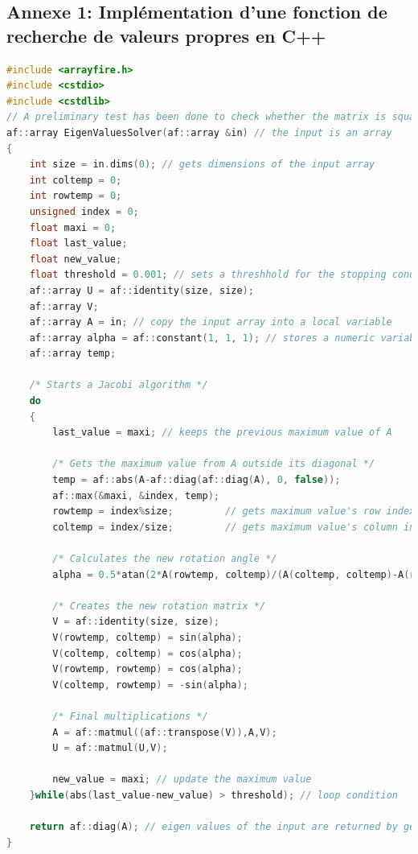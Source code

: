 \documentclass[10pt]{report}
\begin{document}
\begin{appendix}
	\chapter*{Annexe 1: Implémentation d'une fonction de recherche de valeurs propres en C++}
\vspace{-1cm}
\begin{lstlisting}[language=C++]
#include <arrayfire.h>
#include <cstdio>
#include <cstdlib>
// A preliminary test has been done to check whether the matrix is square and symmteric or not
af::array EigenValuesSolver(af::array &in) // the input is an array
{
	int size = in.dims(0); // gets dimensions of the input array
	int coltemp = 0;
	int rowtemp = 0;
	unsigned index = 0;
	float maxi = 0;
	float last_value;
	float new_value;
	float threshold = 0.001; // sets a threshhold for the stopping condition of the algorithm
	af::array U = af::identity(size, size);
	af::array V;
	af::array A = in; // copy the input array into a local variable
	af::array alpha = af::constant(1, 1, 1); // stores a numeric variable in an array
	af::array temp;
	
	/* Starts a Jacobi algorithm */
	do
	{
		last_value = maxi; // keeps the previous maximum value of A 
		
		/* Gets the maximum value from A outside its diagonal */
		temp = af::abs(A-af::diag(af::diag(A), 0, false)); 
		af::max(&maxi, &index, temp);  
		rowtemp = index%size;         // gets maximum value's row index
		coltemp = index/size;         // gets maximum value's column index
		
		/* Calculates the new rotation angle */
		alpha = 0.5*atan(2*A(rowtemp, coltemp)/(A(coltemp, coltemp)-A(rowtemp, rowtemp)));
		
		/* Creates the new rotation matrix */
		V = af::identity(size, size);
		V(rowtemp, coltemp) = sin(alpha);
		V(coltemp, coltemp) = cos(alpha);
		V(rowtemp, rowtemp) = cos(alpha);
		V(coltemp, rowtemp) = -sin(alpha);
		
		/* Final multiplications */
		A = af::matmul((af::transpose(V)),A,V); 
		U = af::matmul(U,V);
		
		new_value = maxi; // update the maximum value 
	}while(abs(last_value-new_value) > threshold); // loop condition
	
	return af::diag(A); // eigen values of the input are returned by getting
}


\end{lstlisting}
\end{appendix}
\end{document}
